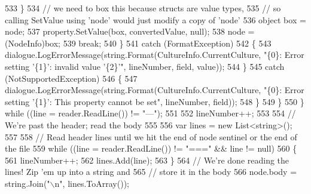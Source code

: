 \begin{DoxyCode}
533                                         \}
534                                         \textcolor{comment}{// we need to box this because structs are value types,}
535                                         \textcolor{comment}{// so calling SetValue using 'node' would just modify a copy of
       'node'}
536                                         \textcolor{keywordtype}{object} box = node;
537                                         property.SetValue(box, convertedValue, null);
538                                         node = (NodeInfo)box;
539                                         \textcolor{keywordflow}{break};
540                                     \}
541                                     \textcolor{keywordflow}{catch} (FormatException)
542                                     \{
543                                         dialogue.LogErrorMessage(string.Format(CultureInfo.CurrentCulture, \textcolor{stringliteral}{
      "\{0\}: Error setting '\{1\}': invalid value '\{2\}'"}, lineNumber, field, value));
544                                     \}
545                                     \textcolor{keywordflow}{catch} (NotSupportedException)
546                                     \{
547                                         dialogue.LogErrorMessage(string.Format(CultureInfo.CurrentCulture, \textcolor{stringliteral}{
      "\{0\}: Error setting '\{1\}': This property cannot be set"}, lineNumber, field));
548                                     \}
549                                 \}
550                             \} \textcolor{keywordflow}{while} ((line = reader.ReadLine()) != \textcolor{stringliteral}{"---"});
551 
552                             lineNumber++;
553 
554                             \textcolor{comment}{// We're past the header; read the body}
555 
556                             var lines = \textcolor{keyword}{new} List<string>();
557 
558                             \textcolor{comment}{// Read header lines until we hit the end of node sentinel or the end of the
       file}
559                             \textcolor{keywordflow}{while} ((line = reader.ReadLine()) != \textcolor{stringliteral}{"==="} && line != null)
560                             \{
561                                 lineNumber++;
562                                 lines.Add(line);
563                             \}
564                             \textcolor{comment}{// We're done reading the lines! Zip 'em up into a string and}
565                             \textcolor{comment}{// store it in the body}
566                             node.body = string.Join(\textcolor{stringliteral}{"\(\backslash\)n"}, lines.ToArray());

\end{DoxyCode}
